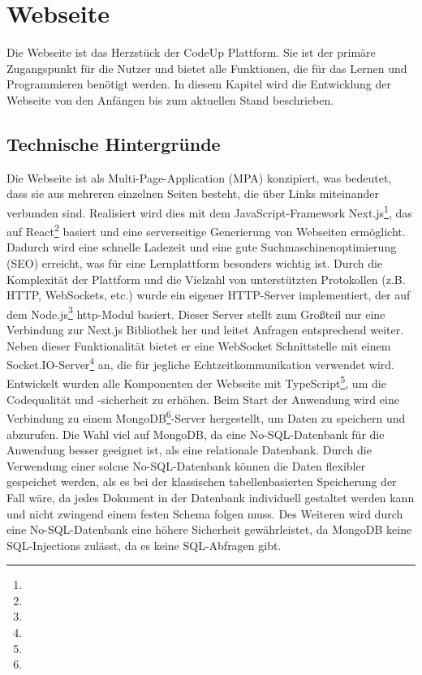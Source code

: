 \documentclass{subfiles}
\begin{document}
\chapter{Webseite}\label{ch:website}
Die Webseite ist das Herzstück der CodeUp Plattform.
Sie ist der primäre Zugangspunkt für die Nutzer und bietet alle Funktionen, die für das Lernen und Programmieren benötigt werden.
In diesem Kapitel wird die Entwicklung der Webseite von den Anfängen bis zum aktuellen Stand beschrieben.

\section{Technische Hintergründe}\label{sec:website-tech}
Die Webseite ist als Multi-Page-Application (MPA) konzipiert, was bedeutet, dass sie aus mehreren einzelnen Seiten besteht, die über Links miteinander verbunden sind.
Realisiert wird dies mit dem JavaScript-Framework Next.js\footnote{}, das auf React\footnote{} basiert und eine serverseitige Generierung von Webseiten ermöglicht.
Dadurch wird eine schnelle Ladezeit und eine gute Suchmaschinenoptimierung (SEO) erreicht, was für eine Lernplattform besonders wichtig ist.
Durch die Komplexität der Plattform und die Vielzahl von unterstützten Protokollen (z.B. HTTP, WebSockets, etc.) wurde ein eigener HTTP-Server implementiert,
der auf dem Node.js\footnote{} \dq http\dq-Modul basiert.
Dieser Server stellt zum Großteil nur eine Verbindung zur Next.js Bibliothek her und leitet Anfragen entsprechend weiter.
Neben dieser Funktionalität bietet er eine WebSocket Schnittstelle mit einem Socket.IO-Server\footnote{} an, die für jegliche Echtzeitkommunikation verwendet wird.
Entwickelt wurden alle Komponenten der Webseite mit TypeScript\footnote{}, um die Codequalität und -sicherheit zu erhöhen.
Beim Start der Anwendung wird eine Verbindung zu einem MongoDB\footnote{}-Server hergestellt, um Daten zu speichern und abzurufen.
Die Wahl viel auf MongoDB, da eine No-SQL-Datenbank für die Anwendung besser geeignet ist, als eine relationale Datenbank.
Durch die Verwendung einer solcne No-SQL-Datenbank können die Daten flexibler gespeichet werden, als es bei der klassischen tabellenbasierten Speicherung der Fall wäre,
da jedes Dokument in der Datenbank individuell gestaltet werden kann und nicht zwingend einem festen Schema folgen muss.
Des Weiteren wird durch eine No-SQL-Datenbank eine höhere Sicherheit gewährleistet, da MongoDB keine SQL-Injections zulässt, da es keine SQL-Abfragen gibt.
\end{document}
